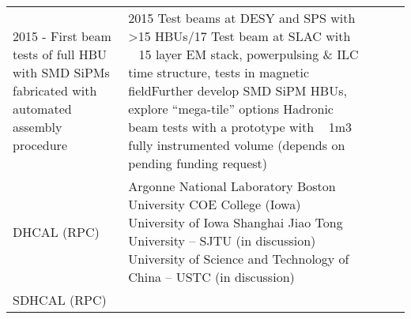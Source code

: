 \begin{landscape}
\begin{table}[h]
\begin{adjustbox}{max width=1\textwidth}
\begin{tabularx}{2\textwidth}{lXXXX}
     2015 - First beam tests of full HBU with SMD SiPMs fabricated with automated assembly procedure                                         &
     2015 Test beams at DESY and SPS with \textgreater 15 HBUs\newline
     2016/17 Test beam at SLAC with ~ 15 layer EM stack, powerpulsing \& ILC time structure, tests in magnetic fieldFurther develop SMD SiPM HBUs, explore ``mega-tile'' options \newline
    Hadronic beam tests with a prototype with ~ 1m3 fully instrumented volume (depends on pending funding request) \\
    DHCAL (RPC)	&
    Argonne National Laboratory\newline
    Boston University                  \newline
    COE College (Iowa)                         \newline
    University of Iowa                                 \newline
    Shanghai Jiao Tong University -- SJTU (in discussion)      \newline
    University of Science and Technology of China -- USTC (in discussion) &
     &
     &
     &                                                                                                                                                                                                                                   \\
     \midrule
    SDHCAL (RPC)                                                                                                   &                                                                                                                                         &                                                                                                                                                                                                                                                                                                                                                                                      &                                                                                                                                                                                                                                                                 &                                                                                                                                                                                                                                     \\

\end{tabularx}
\end{adjustbox}
\end{table}
\end{landscape}
